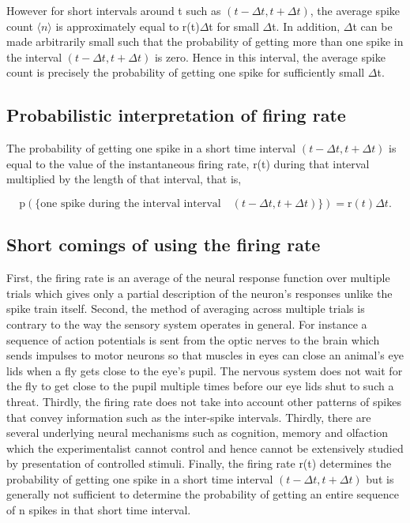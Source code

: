 However for short intervals around t such as $(t-\Delta t, t+\Delta t)$, the average spike count    $\langle n \rangle$ is approximately equal 
to r(t)$\Delta$t for small $\Delta$t.
In addition, $\Delta$t can be made arbitrarily small such that
the probability of getting more than one spike in the interval
 $(t-\Delta t, t+\Delta t)$ is zero. 
Hence in this interval, the average spike count is precisely the probability of getting one spike for sufficiently small $\Delta$t.


\subsection{Probabilistic interpretation of firing rate}
The probability of getting one spike in a short time interval  $(t-\Delta t, t+\Delta t)$ is equal to the value of the instantaneous firing rate, r(t) during that interval multiplied by the length of that interval, that is,

\[ 
\displaystyle  \text{p}(\{ \text{one spike during the interval interval} \quad  (t-\Delta t, t+\Delta t)  \}) = \text{r}(t)\Delta t. 
\]

\subsection{Short comings of using the firing rate}
First, the firing rate is an average of the neural response function over
multiple trials which gives only a partial description of the neuron's responses
unlike the spike train itself.
Second, the method of averaging across multiple trials is contrary to the way
the sensory system operates in general.
For instance a sequence of action potentials is sent from the optic nerves
to the brain which sends impulses to motor neurons so that muscles in eyes can close an animal's eye lids when a fly gets close to the eye's pupil.
The nervous system does not wait for the fly to get close to the pupil multiple
times before our eye lids shut to such a threat.
Thirdly, the firing rate does not take into account other patterns of spikes
that convey information such as the inter-spike intervals.
Thirdly, there are several underlying neural mechanisms such as cognition, memory
and olfaction which the experimentalist cannot control and hence cannot be extensively studied by presentation of controlled stimuli.
Finally, the firing rate r(t) determines the probability of getting one spike
in a short time interval $(t-\Delta t, t+\Delta t)$ but is generally not sufficient to determine the probability of getting an entire sequence of n spikes
in that short time interval.




